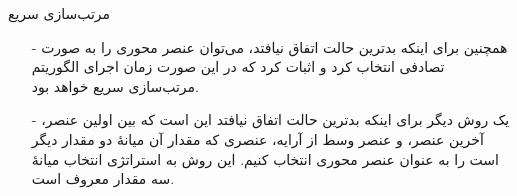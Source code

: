 \begin{frame}{‌مرتب‌سازی سریع}
\begin{itemize}\itemr
\item[-]
همچنین برای اینکه بدترین حالت اتفاق نیافتد، می‌توان عنصر محوری را به صورت تصادفی انتخاب کرد و اثبات کرد که در این صورت زمان اجرای الگوریتم مرتب‌سازی سریع
خواهد بود.
\item[-]
یک روش دیگر برای اینکه بدترین حالت اتفاق نیافتد این است که بین اولین عنصر، آخرین عنصر، و عنصر وسط از آرایه، عنصری که مقدار آن میانهٔ دو مقدار دیگر است را به عنوان عنصر محوری انتخاب کنیم. این روش به استراتژی انتخاب میانهٔ سه مقدار 
معروف است.
\end{itemize}
\end{frame}